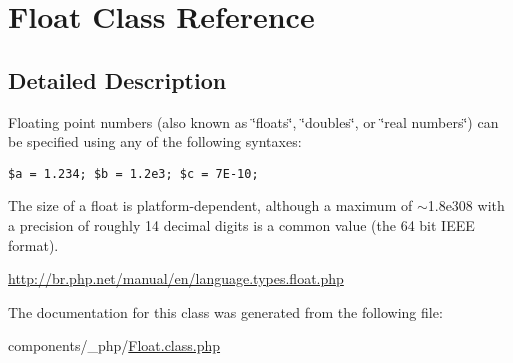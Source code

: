 \hypertarget{class_float}{
\section{Float Class Reference}
\label{class_float}
}


\subsection{Detailed Description}
Floating point numbers (also known as \char`\"{}floats\char`\"{}, \char`\"{}doubles\char`\"{}, or \char`\"{}real numbers\char`\"{}) can be specified using any of the following syntaxes:

{\tt  \$a = 1.234; \$b = 1.2e3; \$c = 7E-10; }

The size of a float is platform-dependent, although a maximum of $\sim$1.8e308 with a precision of roughly 14 decimal digits is a common value (the 64 bit IEEE format).

\hyperlink{}{http://br.php.net/manual/en/language.types.float.php}

The documentation for this class was generated from the following file:\begin{CompactItemize}
\item 
components/\_\-php/\hyperlink{_float_8class_8php}{Float.class.php}\end{CompactItemize}
